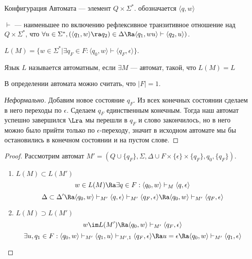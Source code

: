 \begin{definition}
    Конфигурация Автомата --- элемент \(Q \times \Sigma^*\). обозначается \(\langle q, w\rangle\)
\end{definition}

\begin{definition}
    \(\vdash\) --- наименьшее по включению рефлексивное транзитивное отношение над \(Q \times \Sigma^*\), что \(\forall u \in \Sigma^*, (\langle q_1, w \rangle \ra q_2) \in \Delta \Ra \langle q_1, wu\rangle \vdash \langle q_2, u\rangle)\).
\end{definition}

\begin{definition}
    \(L(M) = \{w \in \Sigma^* | \exists q_F \in F: \langle q_0, w \rangle \vdash \langle q_F, \epsilon \rangle\}\).
\end{definition}

\begin{definition}
    Язык \(L\) называется автоматным, если \(\exists M\) --- автомат, такой, что \(L(M) = L\)
\end{definition}

\begin{proposition}
    В определении автомата можно считать, что \(|F| = 1\).
\end{proposition}
\begin{proof}[Неформально]
    Добавим новое состояние \(q_F\). Из всех конечных состоянии сделаем в него переходы по \(\epsilon\). Сделаем \(q_F\) единственным конечным. Тогда наш автомат успешно завершился \(\Lra\) мы перешли в \(q_F\) и слово закончилось, но в него можно было прийти только по \(\epsilon\)-переходу, значит в исходном автомате мы бы остановились в конечном состоянии и на пустом слове.
\end{proof}
\begin{proof}
    Рассмотрим автомат \(M' = (Q \cup \{q_F\}, \Sigma, \Delta \cup F \times \{\epsilon\} \times \{q_F\}, q_0, \{q_F\})\).
    \begin{enumerate}
        \item \(L(M) \subset L(M')\)
        \[w \in L(M) \Ra \exists q \in F: \langle q_0, w \rangle \vdash_M \langle q, \epsilon \rangle\]
        \[\Delta \subset \Delta' \Ra \langle q_0, w \rangle \vdash_{M'} \langle q, \epsilon \rangle \vdash_{M'} \langle q_F, \epsilon \rangle \Ra \langle q_0, w \rangle \vdash_{M'} \langle q_F, \epsilon \rangle\]
        \item \(L(M) \supset L(M')\)
        \[w \im L(M') \Ra \langle q_0, w\rangle \vdash_{M'} \langle q_F, \epsilon\rangle\]
        \[\exists u, q_1 \in F: \langle q_0, w\rangle \vdash_{M'} \langle q_1, u\rangle \vdash_{M', 1} \langle q_F, \epsilon\rangle \Ra u = \epsilon \Ra \langle q_0, w\rangle \vdash_{M'} \langle q_1, \epsilon\rangle\]
    \end{enumerate}
\end{proof}

